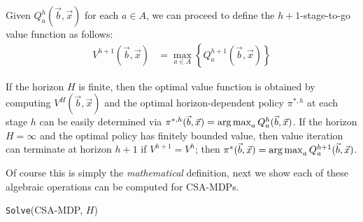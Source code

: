 Given $Q_a^h(\vec{b},\vec{x})$ for each $a \in A$, we can proceed
to define the $h+1$-stage-to-go value function as follows:
\begin{align}
V^{h+1}(\vec{b},\vec{x}) & = \max_{a \in A} \left\{ Q^{h+1}_a(\vec{b},\vec{x}) \right\} \label{eq:vfun}
\end{align}

If the horizon $H$ is finite, then the optimal value function is
obtained by computing $V^H(\vec{b},\vec{x})$ and the optimal
horizon-dependent policy $\pi^{*,h}$ at each stage $h$ can be easily
determined via 
$\pi^{*,h}(\vec{b},\vec{x}) = \argmax_a Q^h_a(\vec{b},\vec{x})$.  
If the horizon 
$H = \infty$ and the optimal policy has finitely bounded value, 
then value iteration can terminate at horizon $h+1$ if 
$V^{h+1} = V^{h}$; then 
$\pi^*(\vec{b},\vec{x}) = \argmax_a Q^{h+1}_a(\vec{b},\vec{x})$.

Of course this is simply the \emph{mathematical} definition, next
we show each of these algebraic operations can be computed for
CSA-MDPs.


\incmargin{.5em}
\linesnumbered
\begin{algorithm}[t!]
\dontprintsemicolon
{}
\caption{\footnotesize \texttt{Solve}(CSA-MDP, $H$) \label{alg:vi}}
\end{algorithm}
\decmargin{.5em}

